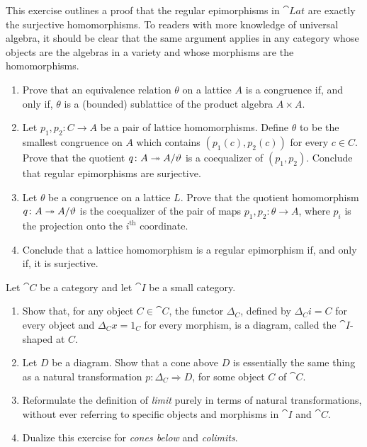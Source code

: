 \begin{exercise}\label{exe:regularepiquotient}
This exercise outlines a proof that the regular epimorphisms in  $\cat{Lat}$ are exactly the surjective homomorphisms. To readers with more knowledge of universal algebra, it should be clear that the same argument applies in any category whose objects are the algebras in a variety and whose morphisms are the homomorphisms.
\begin{enumerate}
\item Prove that an equivalence relation $\theta$ on a lattice $A$ is a congruence if, and only if, $\theta$ is a (bounded) sublattice of the product algebra $A \times A$.
\item Let $p_1, p_2 \colon C \to A$ be a pair of lattice homomorphisms. Define $\theta$ to be the smallest congruence on $A$ which contains $(p_1(c),p_2(c))$ for every $c 
\in C$. Prove that the quotient $q \colon A \twoheadrightarrow A/{\vartheta}$ is a coequalizer of $(p_1,p_2)$. Conclude that regular epimorphisms are surjective.
\item Let $\theta$ be a congruence on a lattice $L$. Prove that the quotient homomorphism $q \colon A \twoheadrightarrow A/{\vartheta}$ is the coequalizer of the pair of maps $p_1, p_2 \colon \theta \to A$, where $p_i$ is the projection onto the $i^\mathrm{th}$ coordinate.
\item Conclude that a lattice homomorphism is a regular epimorphism if, and only if, it is surjective.
\end{enumerate}
\end{exercise}


\begin{exercise}\label{exe:cones-constant}
  Let $\cat{C}$ be a category and let $\cat{I}$ be a small category.
  \begin{enumerate}
  \item Show that, for any object $C \in \cat{C}$, the functor $\Delta_C$, defined by $\Delta_Ci = C$ for every object and $\Delta_Cx = 1_C$ for every morphism, is a diagram, called the $\cat{I}$-shaped  at $C$.
  \item Let $D$ be a diagram. Show that a cone above $D$ is essentially the same thing as a natural transformation $p \colon \Delta_C \Rightarrow D$, for some object $C$ of $\cat{C}$.
  \item Reformulate the definition of \emph{limit} purely in terms of natural transformations, without ever referring to specific objects and morphisms in $\cat{I}$ and $\cat{C}$.
  \item Dualize this exercise for \emph{cones below} and \emph{colimits}.
  \end{enumerate}
\end{exercise}


